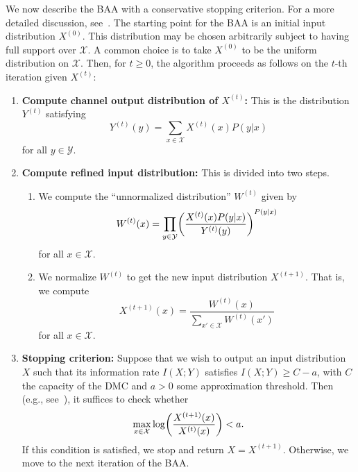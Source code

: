 \documentclass[11pt]{article}
\newcommand{\cX}{\mathcal{X}}
\newcommand{\cY}{\mathcal{Y}}
\let\originalleft\left
\let\originalright\right
\renewcommand{\left}{\mathopen{}\mathclose\bgroup\originalleft}
\renewcommand{\right}{\aftergroup\egroup\originalright}
\begin{document}
We now describe the BAA with a conservative stopping criterion.
For a more detailed discussion, see~\cite[Chapter 9]{Yeu08}.
The starting point for the BAA is an initial input distribution $X^{(0)}$.
This distribution may be chosen arbitrarily subject to having full support over $\cX$. 
A common choice is to take $X^{(0)}$ to be the uniform distribution on $\cX$.
Then, for $t\geq 0$, the algorithm proceeds as follows on the $t$-th iteration given $X^{(t)}$:
\begin{enumerate}
    \item \textbf{Compute  channel output distribution of $X^{(t)}$:} This is the distribution $Y^{(t)}$ satisfying
    \begin{equation*}
        Y^{(t)}(y)= \sum_{x\in\cX} X^{(t)}(x) P(y|x)
    \end{equation*}
    for all $y\in\cY$.

    \item \label{step:refined-input}
    
    \textbf{Compute  refined input distribution:}
    This is divided into two steps.
    \begin{enumerate}
        \item We compute the ``unnormalized distribution'' $W^{(t)}$ given by
        \begin{equation*}
            W^{(t)}(x) = \prod_{y\in\cY} \left(\frac{X^{(t)}(x) P(y|x)}{Y^{(t)}(y)}\right)^{P(y|x)}
        \end{equation*}
        for all $x\in\cX$.

        \item We normalize $W^{(t)}$ to get the new input distribution $X^{(t+1)}$.
        That is, we compute
        \begin{equation*}
            X^{(t+1)}(x)= \frac{W^{(t)}(x)}{\sum_{x'\in\cX}W^{(t)}(x')}
        \end{equation*}
        for all $x\in\cX$.
    \end{enumerate}

    \item \textbf{Stopping criterion:} Suppose that we wish to output an input distribution $X$ such that its information rate $I(X;Y)$ satisfies $I(X;Y)\geq C-a$, with $C$ the capacity of the DMC and $a>0$ some approximation threshold.
    Then (e.g., see~\cite[Equation (32)]{Ari72}), it suffices to check whether
    \begin{equation*}
        \max_{x\in\cX} \log\left(\frac{X^{(t+1)}(x)}{X^{(t)}(x)}\right) < a.
    \end{equation*}
    If this condition is satisfied, we stop and return $X=X^{(t+1)}$.
    Otherwise, we move to the next iteration of the BAA.
    
\end{enumerate}
\end{document}
